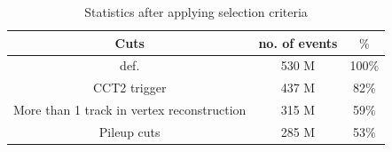     \begin{table}[h]
    \caption{ Statistics after applying selection criteria }
    \begin{center}
        \begin{tabular}{|c|c|c|}
            \hline
            Cuts & no. of events & $\%$ \\
            \hline
            \hline
            def. &  530 M & 100$\%$ \\
            \hline
            CCT2 trigger & 437 M & 82$\%$ \\
            \hline
            More than 1 track in vertex reconstruction & 315 M & 59$\%$ \\
            \hline
            Pileup cuts & 285 M &  53$\%$ \\
            \hline
        \end{tabular}
    \end{center}
    \label{EventCutTable}
\end{table}